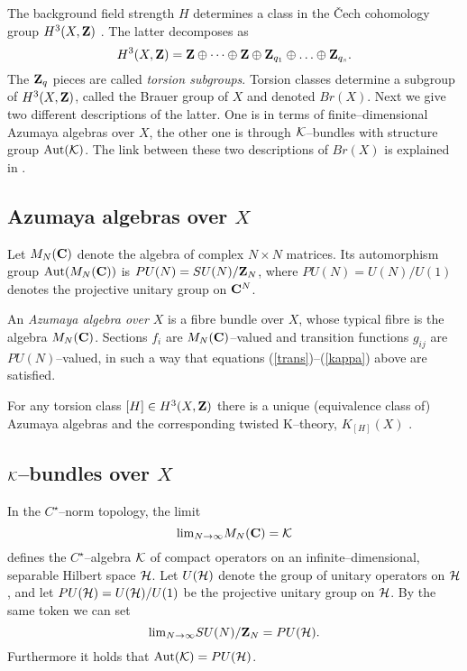 \documentclass[a4paper,a4paper]{article}
\begin{document}
The background field strength $H$ determines a class in the  
\v Cech cohomology group $H^3(X,{\bf Z})$ \cite{BOTT}.
The latter decomposes as   
\begin{equation}  
H^3(X,{\bf Z})={\bf Z} \oplus \dots \oplus {\bf Z} \oplus {\bf Z}_{q_1}   
\oplus \ldots \oplus {\bf Z}_{q_s}.  
\label{decomposes}
\end{equation}  
The ${\bf Z}_q$ pieces are called {\it torsion subgroups}.  
Torsion classes  determine a subgroup of $H^3(X,{\bf Z})$, 
called the Brauer group of $X$ and denoted $Br(X)$. 
Next we give two different descriptions of the latter.   
One is in terms of finite--dimensional Azumaya algebras over $X$,   
the other one is through ${\cal K}$--bundles with structure  
group ${\rm Aut}({\cal K})$.  The link between these two descriptions 
of $Br(X)$ is explained in \cite{BOUWMATHAI}.   
 
\subsection{Azumaya algebras over $X$}\label{azumaya}  
  
Let $M_N({\bf C})$ denote the algebra of complex $N\times N$ matrices.   
Its automorphism group ${\rm Aut}(M_N({\bf C}))$ is  $PU(N)=SU(N)/{\bf Z}_N$,   
where $PU(N)=U(N)/U(1)$ denotes the projective unitary group on ${\bf C}^N$.  
  
An {\it Azumaya algebra over $X$} is a fibre bundle over $X$, whose typical 
fibre is the algebra $M_N({\bf C})$. Sections $f_i$ are $M_N({\bf C})$--valued 
and transition functions $g_{ij}$ are $PU(N)$--valued, in such a way that 
equations (\ref{trans})--(\ref{kappa}) above are satisfied.  
  
For any torsion class $[H]\in H^3(X,{\bf Z})$ there is a unique  
(equivalence class of) Azumaya algebras and the corresponding twisted 
K--theory, $K_{[H]}(X)$ \cite{KAPUSTIN, BOUWMATHAI}.  
  
\subsection{${\cal K}$--bundles over $X$}\label{kbundles}  
  
In the $C^{\star}$--norm topology, the limit \cite{DIXMIERL}
\begin{equation}
{\rm lim}_{N\to\infty}M_N({\bf C})={\cal K}
\label{limkappa}
\end{equation}
defines the $C^{\star}$--algebra ${\cal K}$ of compact operators on an infinite--dimensional, 
separable Hilbert space ${\cal H}$. Let $U({\cal H})$ denote 
the group of unitary operators on ${\cal H}$, and let $PU({\cal H})=U({\cal H})/U(1)$ 
be the projective unitary group on ${\cal H}$. By the same token we can set 
\begin{equation}
{\rm lim}_{N\to\infty} SU(N)/{\bf Z}_N=PU({\cal H}).
\label{sett}
\end{equation}   
Furthermore it holds that ${\rm Aut}({\cal K})=PU({\cal H})$.  
  
\end{document}
